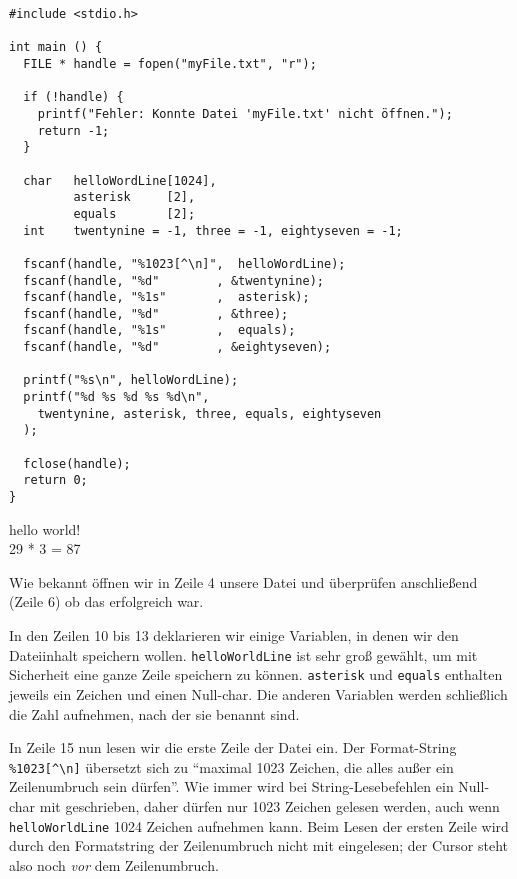 \begin{codebox}
\begin{verbatim}
#include <stdio.h>

int main () {
  FILE * handle = fopen("myFile.txt", "r");
  
  if (!handle) {
    printf("Fehler: Konnte Datei 'myFile.txt' nicht öffnen.");
    return -1;
  }

  char   helloWordLine[1024], 
         asterisk     [2], 
         equals       [2];
  int    twentynine = -1, three = -1, eightyseven = -1;
  
  fscanf(handle, "%1023[^\n]",  helloWordLine);
  fscanf(handle, "%d"        , &twentynine);
  fscanf(handle, "%1s"       ,  asterisk);
  fscanf(handle, "%d"        , &three);
  fscanf(handle, "%1s"       ,  equals);
  fscanf(handle, "%d"        , &eightyseven);
  
  printf("%s\n", helloWordLine);
  printf("%d %s %d %s %d\n", 
    twentynine, asterisk, three, equals, eightyseven
  );
  
  fclose(handle);
  return 0;
}
\end{verbatim}
\end{codebox}

\begin{cmdbox}
hello world!\\
29 * 3 = 87
\end{cmdbox}

Wie bekannt öffnen wir in Zeile 4 unsere Datei und überprüfen anschließend (Zeile 6) ob das erfolgreich war.

In den Zeilen 10 bis 13 deklarieren wir einige Variablen, in denen wir den Dateiinhalt speichern wollen. \texttt{helloWorldLine} ist sehr groß gewählt, um mit Sicherheit eine ganze Zeile speichern zu können. \texttt{asterisk} und \texttt{equals} enthalten jeweils ein Zeichen und einen Null-char. Die anderen Variablen werden schließlich die Zahl aufnehmen, nach der sie benannt sind.

In Zeile 15 nun lesen wir die erste Zeile der Datei ein. Der Format-String 
\texttt{\%1023[\textasciicircum\textbackslash n]}
übersetzt sich zu \enquote{maximal 1023 Zeichen, die alles außer ein Zeilenumbruch sein dürfen}. Wie immer wird bei String-Lesebefehlen ein Null-char mit geschrieben, daher dürfen nur 1023 Zeichen gelesen werden, auch wenn \texttt{helloWorldLine} 1024 Zeichen aufnehmen kann. Beim Lesen der ersten Zeile wird durch den Formatstring der Zeilenumbruch nicht mit eingelesen; der Cursor steht also noch \emph{vor} dem Zeilenumbruch.

